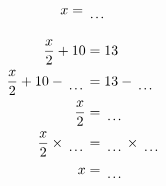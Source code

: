 \documentclass[12pt]{article}
\newcounter{minipagecount}
\begin{document}
\begin{multicols}{2}
\begin{minipage}[t]{0.45\textwidth}
\begin{align*}
        x &= \dotuline{\hspace{5mm}}\\
    \end{align*}
\end{minipage} %
\noindent{(\theminipagecount)}\hspace{0.1mm} %
\begin{minipage}[t]{0.45\textwidth} %
    \vspace{-26pt}  %
    \raggedright %
    \begin{align*} %
        \frac{x}{2} + 10 &= 13\\
        \frac{x}{2} + 10 - \dotuline{\hspace{5mm}} &= 13 - \dotuline{\hspace{5mm}}\\
        \frac{x}{2} &= \dotuline{\hspace{5mm}}\\
        \frac{x}{2} \times\dotuline{\hspace{5mm}} &= \dotuline{\hspace{5mm}} \times\dotuline{\hspace{5mm}}\\
        x &= \dotuline{\hspace{5mm}}\\
    \end{align*}
\end{minipage}\columnbreak
\noindent{(\theminipagecount)}\hspace{0.1mm} %
\begin{minipage}[t]{0.45\textwidth} %
    \vspace{-26pt}  %

\end{minipage}
\end{multicols}
\end{document}
